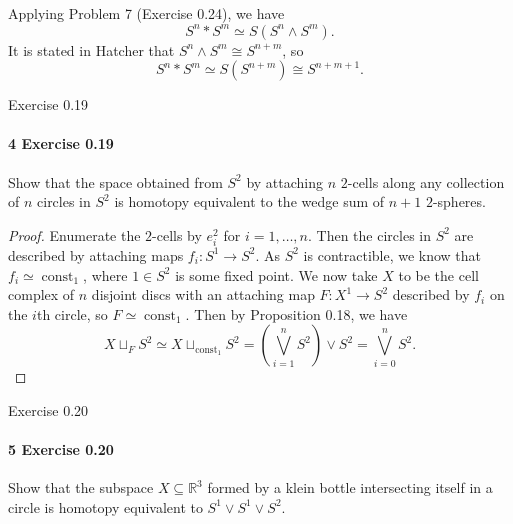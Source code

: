 \documentclass[12pt]{article}
\newlength{\myparskip}
\newenvironment{fullbox}{\begin{lrbox}{\savefullbox}\begin{minipage}{\dimexpr\textwidth-2\fboxsep\relax}\setlength{\parskip}{\myparskip}}{\end{minipage}\end{lrbox}\framebox[\textwidth]{\usebox{\savefullbox}}}
\newenvironment{pbox}[1][]{\begin{fullbox}\ifx#1\empty\else\paragraph{#1}\phantom{}\fi}{\end{fullbox}}
\theoremstyle{definition}
\newcommand{\R}{\mathbb{R}}
\newcommand{\<}{\langle}
\renewcommand{\>}{\rangle}
\newcommand{\isom}{\cong}
\newcommand{\seq}{\subseteq}
\newcommand{\htpy}{\simeq}
\DeclareMathOperator{\const}{const}
\begin{document}
Applying Problem 7 (Exercise 0.24), we have
\[
    S^n * S^m \htpy S(S^n \wedge S^m).
\]
It is stated in Hatcher that $S^n \wedge S^m \isom S^{n + m}$, so
\[
    S^n * S^m \htpy S(S^{n + m}) \isom S^{n + m + 1}.
\]


\begin{pbox}[4 Exercise 0.19]
    Show that the space obtained from $S^2$ by attaching $n$ $2$-cells along any collection of $n$ circles in $S^2$ is homotopy equivalent to the wedge sum of $n + 1$ $2$-spheres.
\end{pbox}

\begin{proof}
    Enumerate the $2$-cells by $e^2_i$ for $i = 1, \dots, n$.
    Then the circles in $S^2$ are described by attaching maps $f_i : S^1 \to S^2$.
    As $S^2$ is contractible, we know that $f_i \htpy \const_1$, where $1 \in S^2$ is some fixed point.
    We now take $X$ to be the cell complex of $n$ disjoint discs with an attaching map $F : X^1 \to S^2$ described by $f_i$ on the $i$th circle, so $F \htpy \const_1$.
    Then by Proposition 0.18, we have
    \[\textstyle
        X \sqcup_F S^2 \htpy X \sqcup_{\const_1} S^2 = (\bigvee_{i=1}^n S^2) \vee S^2 = \bigvee_{i=0}^n S^2.
    \]
\end{proof}

\begin{pbox}[5 Exercise 0.20]
    Show that the subspace $X \seq \R^3$ formed by a klein bottle intersecting itself in a circle is homotopy equivalent to $S^1 \vee S^1 \vee S^2$.
\end{pbox}
\end{document}
